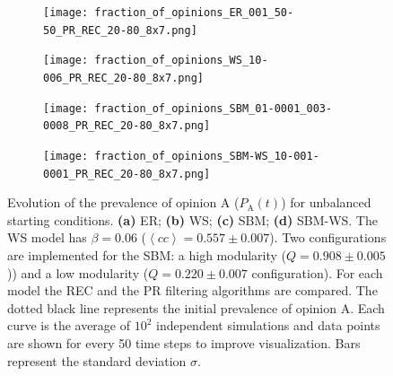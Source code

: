 \documentclass[11 pt , letterpaper , twoside , openright]{book}
\begin{document}
\begin{figure}[H]
  \begin{subfigure}[t]{0.49\textwidth}
    \subcaption{}
  	\texttt{[image: fraction\_of\_opinions\_ER\_001\_50-50\_PR\_REC\_20-80\_8x7.png]}
      \end{subfigure}
  \begin{subfigure}[t]{0.49\textwidth}
    \subcaption{}
  	\texttt{[image: fraction\_of\_opinions\_WS\_10-006\_PR\_REC\_20-80\_8x7.png]}
    \label{ws_20-80_op}
  \end{subfigure}
  \begin{subfigure}[t]{0.49\textwidth}    
    \subcaption{}
    \texttt{[image: fraction\_of\_opinions\_SBM\_01-0001\_003-0008\_PR\_REC\_20-80\_8x7.png]}
  \end{subfigure}
  \begin{subfigure}[t]{0.49\textwidth}
    \subcaption{}
    \texttt{[image: fraction\_of\_opinions\_SBM-WS\_10-001-0001\_PR\_REC\_20-80\_8x7.png]}
    \label{sbm-ws_20-80_op}
  \end{subfigure}
  \captionsetup{format=plain}
  \caption[Evolution of the prevalence of opinion A ($P_\text{A}(t)$) for unbalanced starting conditions.]{Evolution of the prevalence of opinion A ($P_\text{A}(t)$) for unbalanced starting conditions. \textbf{(a)} ER; \textbf{(b)} WS; \textbf{(c)} SBM; \textbf{(d)} SBM-WS. The WS model has $\beta = 0.06$ ($\left<cc\right> = 0.557 \pm 0.007$). Two configurations are implemented for the SBM: a high modularity ($Q = 0.908 \pm 0.005$)) and a low modularity ($Q = 0.220 \pm 0.007$ configuration). For each model the REC and the PR filtering algorithms are compared. The dotted black line represents the initial prevalence of opinion A. Each curve is the average of $10^2$ independent simulations and data points are shown for every 50 time steps to improve visualization. Bars represent the standard deviation $\sigma$.}
\label{ev_op_20_80}
\end{figure}
\noindent
\end{document}
